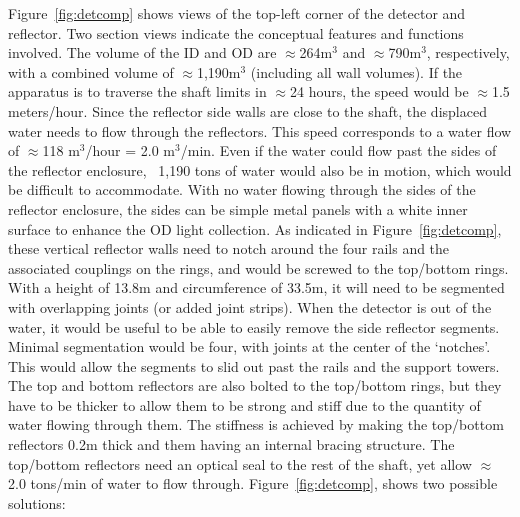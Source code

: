 Figure~\ref{fig:detcomp} shows views of the top-left corner of the detector and reflector.
 Two section views indicate the conceptual features and functions involved. The volume of the ID and OD are $\approx$264m$^3$ and $\approx$790m$^3$, respectively, with a combined volume of $\approx$1,190m$^3$ 
(including all
 wall volumes). If the apparatus is to traverse the shaft limits in $\approx$24 hours, the speed
 would be $\approx$1.5 meters/hour. Since the reflector side walls are close to the shaft, the 
displaced water needs to flow through the reflectors. This speed corresponds to a water
 flow of $\approx$118 m$^3$/hour = 2.0 m$^3$/min. Even if the water could flow past the sides of the
 reflector enclosure, ~1,190 tons of water would also be in motion, which would be difficult to accommodate.
With no water flowing through the sides of the reflector enclosure, the sides can be
 simple metal panels with a white inner surface to enhance the OD light collection.
As indicated in Figure~\ref{fig:detcomp}, these vertical reflector walls need to 
notch around the four rails and the associated couplings on the rings, and would be screwed to the top/bottom rings. With a height of 13.8m
 and circumference of 33.5m, it will need to be segmented with overlapping joints
 (or added joint strips). When the detector is out of the water, it would be useful
 to be able to easily remove the side reflector segments. Minimal segmentation would
 be four, with joints at the center of the `notches'.
This would allow the segments  to slid out past the rails and the support towers.
The top and bottom reflectors
 are also bolted to the top/bottom rings, but they have to be thicker to allow them
 to be strong and stiff due to the quantity of water flowing through them. The stiffness is achieved by
 making the top/bottom reflectors 0.2m thick and them having an internal bracing
 structure.  The top/bottom reflectors need an optical seal to the rest of the
 shaft, yet allow $\approx$2.0 tons/min of water to flow through. Figure~\ref{fig:detcomp}, 
shows two possible solutions:


